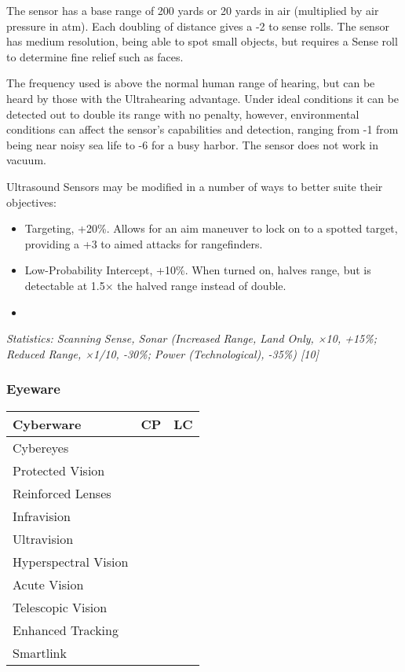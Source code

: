 \begin{multicols*}{3}
	The sensor has a base range of 200 yards or 20 yards in air (multiplied by air pressure in atm). Each doubling of distance gives a -2 to sense rolls. The sensor has medium resolution, being able to spot small objects, but requires a Sense roll to determine fine relief such as faces.
	
	The frequency used is above the normal human range of hearing, but can be heard by those with the Ultrahearing advantage. Under ideal conditions it can be detected out to double its range with no penalty, however, environmental conditions can affect the sensor's capabilities and detection, ranging from -1 from being near noisy sea life to -6 for a busy harbor. The sensor does not work in vacuum.
	
	Ultrasound Sensors may be modified in a number of ways to better suite their objectives:
	\begin{itemize}
		\item Targeting, +20\%. Allows for an aim maneuver to lock on to a spotted target, providing a +3 to aimed attacks for rangefinders.
		\item Low-Probability Intercept, +10\%. When turned on, halves range, but is detectable at 1.5× the halved range instead of double.
		\item 
	\end{itemize}
	
	\textit{\textcolor{OliveGreen}{Statistics: Scanning Sense, Sonar (Increased Range, Land Only, ×10, +15\%; Reduced Range, ×1/10, -30\%; Power (Technological), -35\%) [10]}}
	
	\subsubsection{Eyeware}
	
	\begin{center}
		\begin{tabularx}{0.32\textwidth}{|X|c|c|}
			\hline
			Cyberware & CP & LC\\
			\hline
			\hline
			Cybereyes & & \\
			\hline
			Protected Vision & & \\
			Reinforced Lenses & & \\
			Infravision & & \\
			Ultravision & & \\
			Hyperspectral Vision & & \\
			Acute Vision & & \\
			Telescopic Vision & & \\
			Enhanced Tracking & & \\
			Smartlink & & \\
			\hline
		\end{tabularx}
	\end{center}
	

\end{multicols*}
